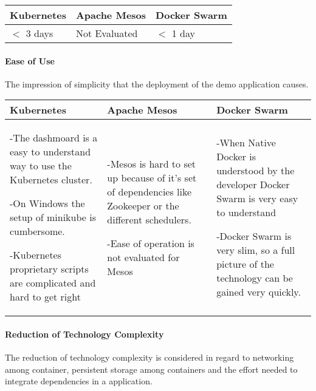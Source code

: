\begin{center}
  \begin{tabular}{ | p{4.5cm} | p{4.5cm} | p{4.5cm} | }
    \hline
    \textbf{Kubernetes}&\textbf{Apache Mesos}&\textbf{Docker Swarm}\\\hline
    $<$ 3 days & Not Evaluated & $<$ 1 day \\
    \hline
  \end{tabular}
\end{center}

\newpage
\paragraph{Ease of Use}

The impression of simplicity that the deployment of the demo application
causes.

\begin{center}
  \begin{tabular}{ | p{4.5cm} | p{4.5cm} | p{4.5cm} | }
    \hline
    \textbf{Kubernetes}&\textbf{Apache Mesos}&\textbf{Docker Swarm}\\\hline
    -The dashmoard is a easy to understand way to use the Kubernetes cluster.
    
    -On Windows the setup of minikube is cumbersome.
    
    -Kubernetes proprietary scripts are complicated and hard to get right &
    
    
    -Mesos is hard to set up because of it's set of dependencies like Zookeeper
    or the different schedulers.
    
    -Ease of operation is not evaluated for Mesos& 
    
    -When Native Docker is understood by the developer Docker Swarm is very
    easy to understand
    
    -Docker Swarm is very slim, so a full picture of the technology can be
    gained very quickly.\\
    \hline
  \end{tabular}
\end{center}

\paragraph{Reduction of Technology Complexity}

The reduction of technology complexity is considered in regard to networking
among container, persistent storage among containers and the effort needed to
integrate dependencies in a application.

